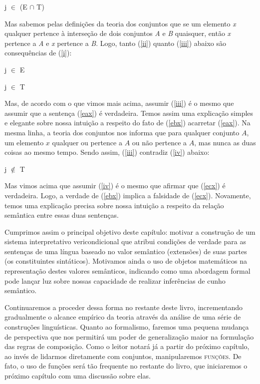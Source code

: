 \begin{exe}
	\ex j $\in$ (E $\cap$ T) \label{i}
\end{exe}

\n Mas sabemos pelas defini\-çõ\-es da teoria dos conjuntos que se um elemento \textit{x} qualquer pertence à interse\-ção de dois conjuntos \textit{A} e \textit{B} quaisquer, então \textit{x} pertence a \textit{A} e \textit{x} pertence a \textit{B}. Logo, tanto (\ref{ii}) quanto (\ref{iii}) abaixo são consequências de (\ref{i}):

\begin{exe}
	\ex j $\in$ E \label{ii}
\end{exe}

\begin{exe}
	\ex j $\in$ T  \label{iii}
\end{exe}

\n Mas, de acordo com o que vimos mais acima, assumir (\ref{iii}) é o mesmo que assumir que a sentença (\ref{eax}) é verdadeira. Temos
assim uma explica\-ção simples e elegante sobre nossa intui\-ção a
respeito do fato de (\ref{ebx}) acarretar (\ref{eax}). Na mesma
linha, a teoria dos conjuntos nos informa que para qualquer
conjunto $A$, um elemento $x$ qualquer ou pertence a
$A$ ou não pertence a $A$, mas nunca as duas coisas
ao mesmo tempo. Sendo assim, (\ref{iii}) contradiz
(\ref{iv}) abaixo:

\begin{exe}
	\ex j $\not\in$ T  \label{iv}
\end{exe}

\n Mas vimos acima que assumir (\ref{iv}) é o mesmo que afirmar que
(\ref{ecx}) é verdadeira. Logo, a verdade de (\ref{ebx}) implica a
falsidade de (\ref{ecx}). Novamente, temos uma explica\-ção precisa
sobre nossa intui\-ção a respeito da rela\-ção semântica entre
essas duas sen\-ten\-ças.

Cumprimos assim o principal objetivo deste capítulo: motivar a
constru\-ção de um sistema interpretativo vericondicional que atribui
condi\-çõ\-es de verdade para as sen\-ten\-ças de uma língua
baseado no valor semântico (extensões) de suas partes (os
constituintes sintáticos). Motivamos ainda o uso de objetos
matemáticos na representa\-ção destes valores semânticos,
indicando como uma abordagem formal pode lançar luz sobre nossas
capacidade de realizar inferências de cunho semântico.

Continuaremos a proceder dessa forma no restante deste livro,
incrementando gradualmente o alcance empírico da teoria através da
análise de uma série de constru\-çõ\-es linguísticas. Quanto ao
formalismo, faremos uma pequena mudança de perspectiva que nos
permitirá um poder de generaliza\-ção maior na formula\-ção das
regras de composi\-ção. Como o leitor notará já a partir do
próximo capítulo, ao invés de lidarmos diretamente com conjuntos,
manipularemos \textsc{fun\-çõ\-es}. De fato, o uso de fun\-çõ\-es
será tão frequente no restante do livro, que iniciaremos o próximo capítulo com uma discussão sobre elas.

